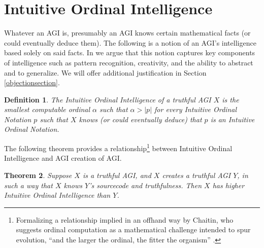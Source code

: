 \documentclass[runningheads]{llncs}
\newtheorem{mytheorem}{Theorem}
\newtheorem{mydefinition}[mytheorem]{Definition}
\begin{document}
\section{Intuitive Ordinal Intelligence}
\label{informalargumentsection}

Whatever an AGI is, presumably an AGI knows certain mathematical facts
(or could eventually deduce them).
The following is a notion of an AGI's intelligence based
solely on said facts. In \cite{alexander2019measuring}
we argue that this notion captures key components of intelligence such as
pattern recognition, creativity, and the ability to abstract and to
generalize. We will offer additional justification in
Section \ref{objectionsection}.

\begin{mydefinition}
\label{maindefinition}
    The \emph{Intuitive Ordinal Intelligence} of a truthful AGI $X$ is the smallest computable
    ordinal $\alpha$ such that $\alpha>|p|$ for every Intuitive Ordinal Notation
    $p$ such that $X$ knows (or could eventually deduce) that $p$ is an
    Intuitive Ordinal Notation.
\end{mydefinition}

The following theorem provides a relationship\footnote{Formalizing a relationship implied
in an offhand way by Chaitin, who suggests ordinal computation as a mathematical challenge
intended to spur evolution, ``and the larger the ordinal,
the fitter the organism'' \cite{chaitin}.} between Intuitive Ordinal Intelligence
and AGI creation of AGI.

\begin{mytheorem}
\label{maintheorem}
    Suppose $X$ is a truthful AGI, and $X$ creates a truthful AGI $Y$,
    in such a way that $X$ knows $Y$'s sourcecode and truthfulness. Then
    $X$ has higher Intuitive Ordinal Intelligence than $Y$.
\end{mytheorem}
\end{document}
